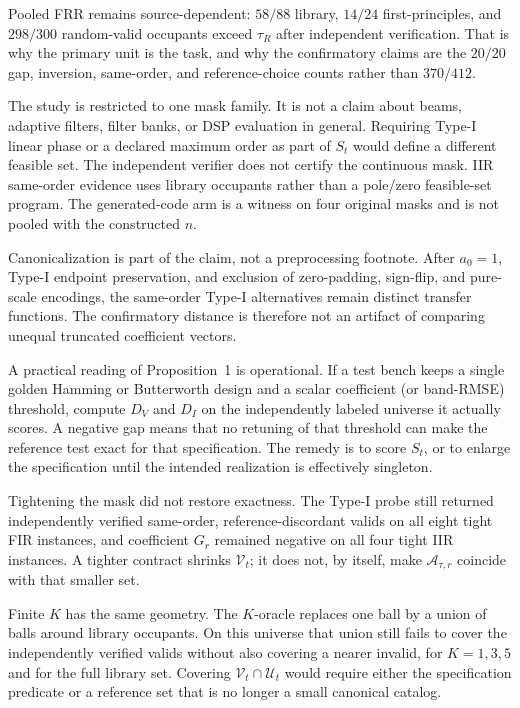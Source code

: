 \documentclass{article}
\begin{document}
Pooled FRR remains source-dependent:
$58/88$ library, $14/24$ first-principles, and $298/300$
random-valid occupants exceed $\tau_R$ after independent
verification.
That is why the primary unit is the task, and why the confirmatory
claims are the $20/20$ gap, inversion, same-order, and
reference-choice counts rather than $370/412$.

The study is restricted to one mask family.
It is not a claim about beams, adaptive filters, filter banks, or
DSP evaluation in general.
Requiring Type-I linear phase or a declared maximum order as part of
$S_t$ would define a different feasible set.
The independent verifier does not certify the continuous mask.
IIR same-order evidence uses library occupants rather than a
pole/zero feasible-set program.
The generated-code arm is a witness on four original masks and is
not pooled with the constructed $n$.

Canonicalization is part of the claim, not a preprocessing footnote.
After $a_0=1$, Type-I endpoint preservation, and exclusion of
zero-padding, sign-flip, and pure-scale encodings, the same-order
Type-I alternatives remain distinct transfer functions.
The confirmatory distance is therefore not an artifact of comparing
unequal truncated coefficient vectors.

A practical reading of Proposition~1 is operational.
If a test bench keeps a single golden Hamming or Butterworth design
and a scalar coefficient (or band-RMSE) threshold, compute $D_V$
and $D_I$ on the independently labeled universe it actually scores.
A negative gap means that no retuning of that threshold can make the
reference test exact for that specification.
The remedy is to score $S_t$, or to enlarge the specification until
the intended realization is effectively singleton.

Tightening the mask did not restore exactness.
The Type-I probe still returned independently verified
same-order, reference-discordant valids on all eight tight FIR
instances, and coefficient $G_r$ remained negative on all four
tight IIR instances.
A tighter contract shrinks $\mathcal{V}_t$; it does not, by itself,
make $\mathcal{A}_{\tau,r}$ coincide with that smaller set.

Finite $K$ has the same geometry.
The $K$-oracle replaces one ball by a union of balls around
library occupants.
On this universe that union still fails to cover the independently
verified valids without also covering a nearer invalid, for
$K=1,3,5$ and for the full library set.
Covering $\mathcal{V}_t\cap\mathcal{U}_t$ would require either the
specification predicate or a reference set that is no longer a
small canonical catalog.
\end{document}
